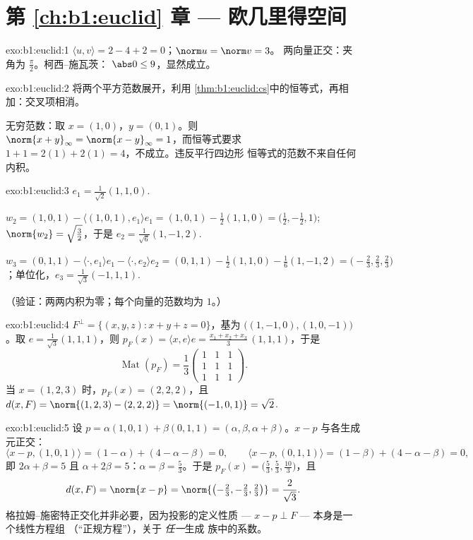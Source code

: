 \section*{第 \ref{ch:b1:euclid} 章 --- 欧几里得空间}

\begin{solution}{exo:b1:euclid:1}
$\langle u, v\rangle = 2 - 4 + 2 = 0$；$\norm u = \norm v = 3$。
两向量正交：夹角为 $\frac\pi2$。柯西–施瓦茨：
$\abs 0 \leq 9$，显然成立。
\end{solution}

\begin{solution}{exo:b1:euclid:2}
将两个平方范数展开，利用
\cref{thm:b1:euclid:cs}中的恒等式，再相加：交叉项相消。

无穷范数：取 $x = (1, 0)$，$y = (0, 1)$。则 $\norm{x + y}_\infty
= \norm{x - y}_\infty = 1$，而恒等式要求 $1 + 1 =
2(1) + 2(1) = 4$，不成立。违反平行四边形
恒等式的范数不来自任何内积。
\end{solution}

\begin{solution}{exo:b1:euclid:3}
$e_1 = \frac{1}{\sqrt 2}(1,1,0)$.

$w_2 = (1,0,1) - \langle (1,0,1), e_1\rangle e_1 = (1,0,1) -
\frac{1}{2}(1,1,0) = \bigl(\tfrac12, -\tfrac12, 1\bigr)$;
$\norm{w_2} = \sqrt{\tfrac32}$，于是 $e_2 =
\frac{1}{\sqrt 6}(1, -1, 2)$.

$w_3 = (0,1,1) - \langle\cdot, e_1\rangle e_1 - \langle\cdot,
e_2\rangle e_2 = (0,1,1) - \frac12 (1,1,0) - \frac16(1,-1,2) =
\bigl(-\tfrac23, \tfrac23, \tfrac23\bigr)$；单位化，$e_3 =
\frac{1}{\sqrt 3}(-1, 1, 1)$.

（验证：两两内积为零；每个向量的范数均为 $1$。）
\end{solution}

\begin{solution}{exo:b1:euclid:4}
$F^\perp = \{(x,y,z) : x + y + z = 0\}$，基为 $\bigl((1,-1,0),
(1,0,-1)\bigr)$。取 $e = \frac{1}{\sqrt3}(1,1,1)$，则 $p_F(x) =
\langle x, e\rangle e = \frac{x_1 + x_2 + x_3}{3}\,(1,1,1)$，于是
\[
\operatorname{Mat}(p_F) = \frac13
\begin{pmatrix} 1&1&1\\ 1&1&1\\ 1&1&1\end{pmatrix}.
\]
当 $x = (1,2,3)$ 时，$p_F(x) = (2,2,2)$，且 $d(x, F) = \norm{(1,2,3)
- (2,2,2)} = \norm{(-1,0,1)} = \sqrt 2$.
\end{solution}

\begin{solution}{exo:b1:euclid:5}
设 $p = \alpha(1,0,1) + \beta(0,1,1) = (\alpha, \beta, \alpha +
\beta)$。$x - p$ 与各生成元正交：
\[
\langle x - p, (1,0,1)\rangle = (1 - \alpha) + (4 - \alpha - \beta)
= 0,
\qquad
\langle x - p, (0,1,1)\rangle = (1 - \beta) + (4 - \alpha - \beta)
= 0,
\]
即 $2\alpha + \beta = 5$ 且 $\alpha + 2\beta = 5$：$\alpha =
\beta = \frac53$。于是 $p_F(x) = \bigl(\frac53, \frac53,
\frac{10}{3}\bigr)$，且
\[
d(x, F) = \norm{x - p} =
\norm{\bigl(-\tfrac23, -\tfrac23, \tfrac23\bigr)} =
\frac{2}{\sqrt 3} .
\]
格拉姆–施密特正交化并非必要，因为投影的定义性质
--- $x - p \perp F$ --- 本身是一个线性方程组
（“正规方程”），关于 \emph{任一}生成
族中的系数。
\end{solution}

